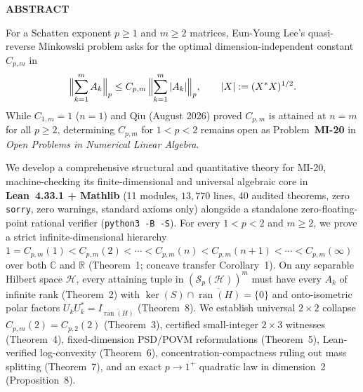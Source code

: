 \documentclass[10pt,letterpaper]{article}
\newcommand{\C}{\mathbb{C}}
\newcommand{\R}{\mathbb{R}}
\newcommand{\Hilb}{\mathcal{H}}
\newcommand{\Sp}{\mathcal{S}_p}
\newcommand{\ran}{\operatorname{ran}}
\begin{document}
\begin{tcolorbox}[abstractbox]
{\sffamily\footnotesize\bfseries\color{accentblue}ABSTRACT}\par\vspace{1.5pt}
{\small
For a Schatten exponent $p \ge 1$ and $m \ge 2$ matrices, Eun-Young Lee's quasi-reverse Minkowski problem asks for the optimal dimension-independent constant $C_{p,m}$ in
\[
  \Bigl\|\sum_{k=1}^m A_k\Bigr\|_p \le C_{p,m}\,\Bigl\|\sum_{k=1}^m |A_k|\Bigr\|_p,
  \qquad |X| := (X^* X)^{1/2}.
\]
While $C_{1,m} = 1$ ($n = 1$) and Qiu (August 2026) proved $C_{p,m}$ is attained at $n = m$ for all $p \ge 2$, determining $C_{p,m}$ for $1 < p < 2$ remains open as Problem~\textbf{MI-20} in \emph{Open Problems in Numerical Linear Algebra}.

We develop a comprehensive structural and quantitative theory for MI-20, machine-checking its finite-dimensional and universal algebraic core in \textbf{Lean~4.33.1 + Mathlib} (11 modules, $13{,}770$ lines, 40 audited theorems, zero \texttt{sorry}, zero warnings, standard axioms only) alongside a standalone zero-floating-point rational verifier (\texttt{python3 -B -S}). For every $1 < p < 2$ and $m \ge 2$, we prove a strict infinite-dimensional hierarchy $1 = C_{p,m}(1) < C_{p,m}(2) < \cdots < C_{p,m}(n) < C_{p,m}(n+1) < \cdots < C_{p,m}(\infty)$ over both $\C$ and $\R$ (Theorem~1; concave transfer Corollary~1). On any separable Hilbert space $\Hilb$, every attaining tuple in $(\Sp(\Hilb))^m$ must have every $A_k$ of infinite rank (Theorem~2) with $\ker(S) \cap \overline{\ran(H)} = \{0\}$ and onto-isometric polar factors $U_k U_k^* = I_{\overline{\ran(H)}}$ (Theorem~8). We establish universal $2\times 2$ collapse $C_{p,m}(2) = C_{p,2}(2)$ (Theorem~3), certified small-integer $2\times 3$ witnesses (Theorem~4), fixed-dimension PSD/POVM reformulations (Theorem~5), Lean-verified log-convexity (Theorem~6), concentration-compactness ruling out mass splitting (Theorem~7), and an exact $p \to 1^+$ quadratic law in dimension~2 (Proposition~8).

}
\end{tcolorbox}
\end{document}
